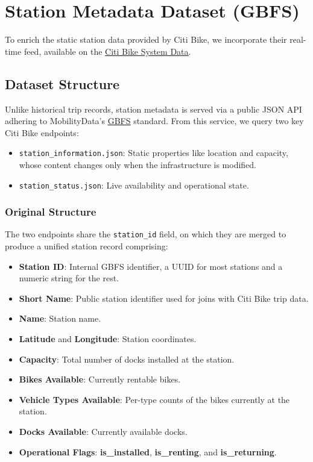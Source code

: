 \section{Station Metadata Dataset (GBFS)}
To enrich the static station data provided by Citi Bike, we incorporate their real-time feed, available on the \href{https://www.citibikenyc.com/system-data}{\underline{Citi Bike System Data}}.

\subsection{Dataset Structure}
Unlike historical trip records, station metadata is served via a public JSON API adhering to MobilityData's \href{https://gbfs.org/}{\underline{GBFS}} standard.
From this service, we query two key Citi Bike endpoints:
\begin{itemize}
    \item \texttt{station\_information.json}: Static properties like location and capacity, whose content changes only when the infrastructure is modified.
    \item \texttt{station\_status.json}: Live availability and operational state.
\end{itemize}

\subsubsection{Original Structure}
The two endpoints share the \texttt{station\_id} field, on which they are merged to produce a unified station record comprising:
\begin{itemize}
    \item \textbf{Station ID}: Internal GBFS identifier, a UUID for most stations and a numeric string for the rest.
    \item \textbf{Short Name}: Public station identifier used for joins with Citi Bike trip data.
    \item \textbf{Name}: Station name.
    \item \textbf{Latitude} and \textbf{Longitude}: Station coordinates.
    \item \textbf{Capacity}: Total number of docks installed at the station.
    \item \textbf{Bikes Available}: Currently rentable bikes.
    \item \textbf{Vehicle Types Available}: Per-type counts of the bikes currently at the station.
    \item \textbf{Docks Available}: Currently available docks.
    \item \textbf{Operational Flags}: \textbf{is\_installed}, \textbf{is\_renting}, and \textbf{is\_returning}.
\end{itemize}

